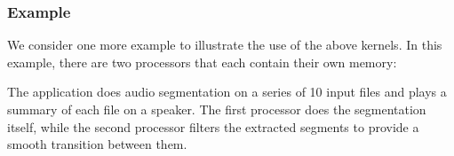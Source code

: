 \subsubsection*{Example}

We consider one more example to illustrate the use of the above
kernels.  In this example, there are two processors that each contain
their own memory:

\begin{figure}[h]
\begin{center}
\end{center}
\vspace{-12pt}
\end{figure}

The application does audio segmentation on a series of 10 input files
and plays a summary of each file on a speaker.  The first processor
does the segmentation itself, while the second processor filters the
extracted segments to provide a smooth transition between them.

